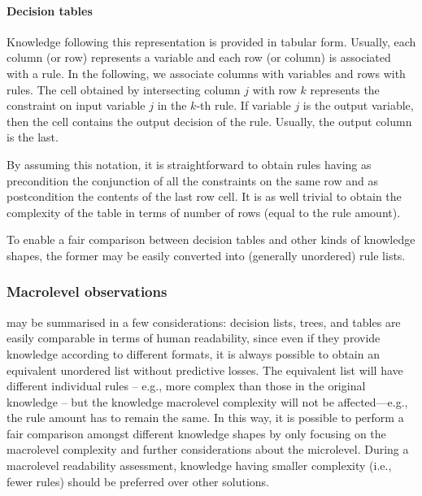 \documentclass[sigconf]{acmart}
\begin{document}
\paragraph{Decision tables}

Knowledge following this representation is provided in tabular form.
%
Usually, each column (or row) represents a variable and each row (or column) is associated with a rule.
%
In the following, we associate columns with variables and rows with rules.
%
The cell obtained by intersecting column $j$ with row $k$ represents the constraint on input variable $j$ in the $k$-th rule.
%
If variable $j$ is the output variable, then the cell contains the output decision of the rule.
%
Usually, the output column is the last.

By assuming this notation, it is straightforward to obtain rules having as precondition the conjunction of all the constraints on the same row and as postcondition the contents of the last row cell.
%
It is as well trivial to obtain the complexity of the table in terms of number of rows (equal to the rule amount).

To enable a fair comparison between decision tables and other kinds of knowledge shapes, the former may be easily converted into (generally unordered) rule lists.

\subsubsection{Macrolevel observations}

 may be summarised in a few considerations: decision lists, trees, and tables are easily comparable in terms of human readability, since even if they provide knowledge according to different formats, it is always possible to obtain an equivalent unordered list without predictive losses.
%
The equivalent list will have different individual rules -- e.g., more complex than those in the original knowledge -- but the knowledge macrolevel complexity will not be affected---e.g., the rule amount has to remain the same.
%
In this way, it is possible to perform a fair comparison amongst different knowledge shapes by only focusing on the macrolevel complexity and further considerations about the microlevel.
%
During a macrolevel readability assessment, knowledge having smaller complexity (i.e., fewer rules) should be preferred over other solutions.
\end{document}
